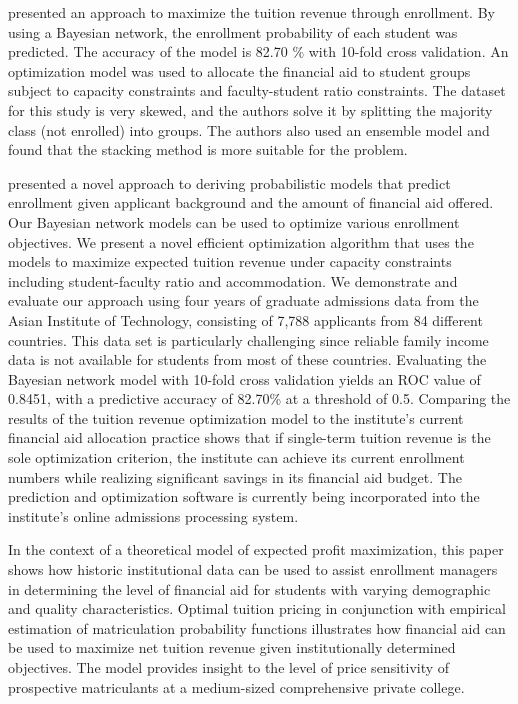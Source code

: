 \documentclass[12pt,english]{report}
\begin{document}
\citet{Thanh2007} presented an approach to maximize the tuition revenue through
enrollment. By using a Bayesian network, the enrollment probability of each
student was predicted. The accuracy of the model is 82.70 $\%$ with 10-fold
cross validation. An optimization model was used to allocate the financial aid
to
student groups subject to capacity constraints and faculty-student ratio
constraints. The dataset for this study is very skewed, and the authors solve
it by splitting the majority class (not enrolled) into groups. The authors also
used an ensemble model and found that the stacking method is more suitable for
the problem.

\citet{Thanh2007}  presented a novel approach to deriving probabilistic models
that predict enrollment given applicant background and the amount of financial
aid offered. Our Bayesian network models can be used to optimize various
enrollment objectives. We present a novel efficient optimization algorithm that
uses the models to maximize expected tuition revenue under capacity constraints
including student-faculty ratio and accommodation. We demonstrate and evaluate
our approach using four years of graduate admissions data from the Asian
Institute of Technology, consisting of 7,788 applicants from 84 different
countries. This data set is particularly challenging since reliable family
income data is not available for students from most of these countries.
Evaluating the Bayesian network model with 10-fold cross validation yields an
ROC value of 0.8451, with a predictive accuracy of 82.70\% at a threshold of
0.5. Comparing the results of the tuition revenue optimization model to the
institute's current financial aid allocation practice shows that if single-term
tuition revenue is the sole optimization criterion, the institute can achieve
its current enrollment numbers while realizing significant savings in its
financial aid budget. The prediction and optimization software is currently
being incorporated into the institute's online admissions processing system.

\citet{Bosshardt2010} In the context of a theoretical model of expected profit
maximization, this paper shows how historic institutional data can be used to
assist enrollment managers in determining the level of financial aid for
students with varying demographic and quality characteristics. Optimal tuition
pricing in conjunction with empirical estimation of matriculation probability
functions illustrates how financial aid can be used to maximize net tuition
revenue given institutionally determined objectives. The model provides insight
to the level of price sensitivity of prospective matriculants at a medium-sized
comprehensive private college.
\end{document}
